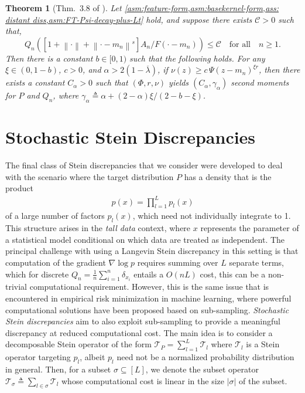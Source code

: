 \documentclass[12pt,paper=letter]{scrreprt}
\newtheorem{theorem}{Theorem}[chapter]
\newcommand{\qtext}[1]{\quad\text{#1}\quad}
\def\defeq{\triangleq} %
\def\defined{\defeq} %
\def\norm#1{\left\|{#1}\right\|} %
\newcommand{\sset}{\sigma} %
\newcommand{\opsub}[1]{\mathcal{T}_{#1}} %
\newcommand{\mcC}{\mathcal{C}}
\newcommand{\feat}{\Phi} %
\newcommand{\statfeat}{F}  %
\newcommand{\statkernel}{\Psi} %
\newcommand{\isdist}{\nu}
\begin{document}
\begin{theorem}[Thm.~3.8 of \citealp{huggins2018random}] \label{thm:RFSD-c-alpha-second-moment}
Let \cref{asm:feature-form,asm:basekernel-form,ass: distant diss,asm:FT-Psi-decay-plus-Lt} hold, and suppose there exists $\mcC > 0$ such that,
\[
Q_n\left([1 + \norm{\cdot} + \norm{\cdot - m_n}^{s}] A_{n}/\statfeat(\cdot - m_n)\right) 
\le \mcC \qtext{for all} n \ge 1. \label{eq:strong-Q-moment-bound}
\]
Then there is a constant $b \in [0, 1)$ such that the following holds.
For any $\xi \in (0, 1 - b)$, $c > 0$, and  $\alpha > 2(1 - \overline{\lambda})$, 
if $\isdist(z) \ge c\,\statkernel(z - m_n)^{\xi r}$, then
there exists a constant $C_{\alpha} > 0$ such that
$(\feat,r,\isdist)$ yields $(C_{\alpha}, \gamma_{\alpha})$ second moments 
for $P$ and $Q_n$, where $\gamma_{\alpha} \defined \alpha + (2 - \alpha)\xi/(2-b-\xi)$. 
\end{theorem}





\section{Stochastic Stein Discrepancies}

The final class of Stein discrepancies that we consider were developed to deal with the scenario where the target distribution $P$ has a density that is the product
\begin{align*}
    p(x) = \prod_{l=1}^L p_l(x) 
\end{align*}
of a large number of factors $p_l(x)$, which need not individually integrate to 1. 
This structure arises in the \emph{tall data} context, where $x$ represents the parameter of a statistical model conditional on which data are treated as independent.
The principal challenge with using a Langevin Stein discrepancy in this setting is that computation of the gradient $\nabla \log p$ requires summing over $L$ separate terms, which for discrete $Q_n = \frac{1}{n} \sum_{i=1}^n \delta_{x_i}$ entails a $O(nL)$ cost, this can be a non-trivial computational requirement.
However, this is the same issue that is encountered in empirical risk minimization in machine learning, where powerful computational solutions have been proposed based on sub-sampling.
\emph{Stochastic Stein discrepancies} aim to also exploit sub-sampling to provide a meaningful discrepancy at reduced computational cost.
The main idea is to consider a decomposable Stein operator of the form $\mathcal{T}_P = \sum_{l=1}^L \mathcal{T}_l$ where $\mathcal{T}_l$ is a Stein operator targeting $p_l$, albeit $p_l$ need not be a normalized probability distribution in general.
Then, for a subset $\sset\subseteq [L]$, we denote the subset operator
$\opsub{\sset} \defeq \sum_{l \in \sset} \opsub{l}$ whose computational cost is linear in the size $|\sigma|$ of the subset.
\end{document}
